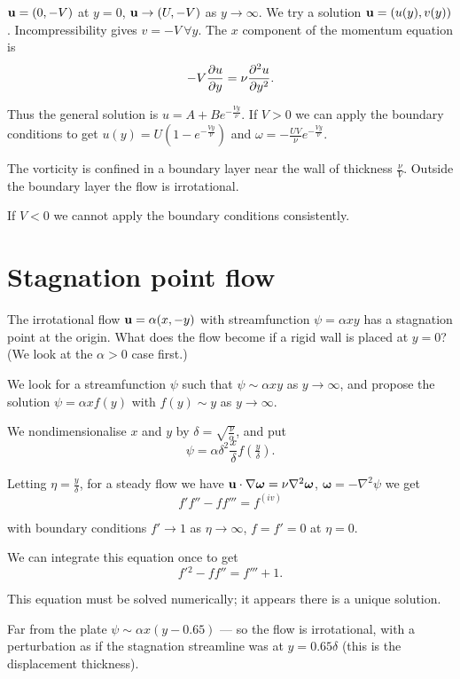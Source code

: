 \documentclass{notes}
\newcommand{\om}{\boldsymbol{\omega}}
\theoremstyle{plain}
\begin{document}
$\mathbf{u} = (0,-V)$ at $y=0$, $\mathbf{u} \to (U,-V)$ as $y \to \infty$.  We try
a solution $\mathbf{u} = (u(y),v(y))$.  Incompressibility gives $v = -V\ \forall y$.
The $x$ component of the momentum equation is
\[
-V \frac{\partial u}{\partial y} = \nu \frac{\partial ^2 u}{\partial y^2}.
\]

Thus the general solution is $u = A + B e^{-\frac{V y}{\nu}}$.  If
$V > 0$ we can apply the boundary conditions to get
$u(y) = U\left( 1- e^{-\frac{V y}{\nu}}\right)$ and
$\omega = -\frac{U V}{\nu} e^{-\frac{V y}{\nu}}$.

The vorticity is confined in a boundary layer near the wall of
thickness $\frac{\nu}{V}$.  Outside the boundary layer the flow is
irrotational.

If $V < 0$ we cannot apply the boundary conditions consistently.

\section{Stagnation point flow}

\vspace{1in}

The irrotational flow $\mathbf{u} = \alpha (x,-y)$ with streamfunction $\psi
= \alpha x y$ has a stagnation point at the origin.  What does the
flow become if a rigid wall is placed at $y = 0$?  (We look at the
$\alpha > 0$ case first.)

We look for a streamfunction $\psi$ such that $\psi \sim \alpha x y$
as $y \to \infty$, and propose the solution
$\psi = \alpha x f(y)$ with $f(y) \sim y$ as $y \to \infty$.

We nondimensionalise $x$ and $y$ by $\delta = \sqrt{\frac{\nu}{\alpha}}$,
and put
\[
\psi = \alpha \delta^2 \frac{x}{\delta} f(\tfrac{y}{\delta}).
\]

Letting $\eta = \frac{y}{\delta}$, for a steady flow we have
$\vu \cdot \nabla \om = \nu \nabla^2 \om$, $\om = - \nabla^2 \psi$
we get
\[
f' f'' - f f''' = f^{(iv)}
\]

with boundary conditions $f' \to 1$ as $\eta \to \infty$, $f = f' = 0$
at $\eta = 0$.

We can integrate this equation once to get
\[
f'{}^2 - f f'' = f''' + 1.
\]

This equation must be solved numerically; it appears there is a unique
solution.

\vspace{1in}

Far from the plate $\psi \sim \alpha x \left( y - 0.65 \right)$ --- so
the flow is irrotational, with a perturbation as if the stagnation streamline
was at $y = 0.65 \delta$ (this is the displacement thickness).
\end{document}
